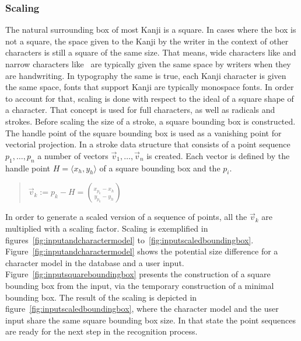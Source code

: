 \subsubsection{Scaling}
\label{sec:hwre:scaling}

The natural surrounding box of most Kanji is a square. In cases where the box
is not a square, the space given to the Kanji by the writer in the context of
other characters is still a square of the same size. That means, wide characters
like  and narrow characters like~ are typically given the same 
space by writers when they are handwriting. In typography the same is true,
each Kanji character is given the same space, fonts that support Kanji are
typically monospace fonts.
In order to account for that, scaling is done with respect to the ideal of a 
square shape of a character. That concept is used for full characters, as well
as radicals and strokes.
Before scaling the size of a stroke, a square bounding box is constructed.
The handle point of the square bounding box is used as a vanishing point for
vectorial projection. In a stroke data structure that consists of a point
sequence \(p_1, \ldots, p_n\)  a number of vectors 
\(\vec{v}_1, \ldots, \vec{v}_n\) is created. Each vector is defined by the
handle point \(H = \langle x_h, y_h \rangle \) of a square bounding box and the \(p_i\).
\begin{quote}
\(
  \vec{v}_k := p_k-H = \binom{x_{p_k}-x_h}{y_{p_k}-y_h}
\)
\end{quote}
In order to generate a scaled version of a sequence of points, 
all the \(\vec{v}_k\) are multiplied with a scaling factor.
Scaling is exemplified in figures~\ref{fig:inputandcharactermodel} 
to~\ref{fig:inputscaledboundingbox}. 
Figure~\ref{fig:inputandcharactermodel} shows the potential
size difference for a character model in the database and a user input.
Figure~\ref{fig:inputsquareboundingbox} presents the construction of a square
bounding box from the input, via the temporary construction of a minimal 
bounding box.
The result of the scaling is depicted in 
figure~\ref{fig:inputscaledboundingbox}, where the character model and the user 
input share the same square bounding box size.
In that state the point sequences are ready for the next step in the
recognition process.

